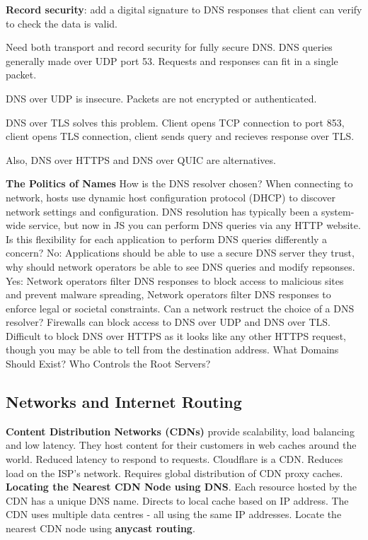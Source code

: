 \documentclass{article}
\begin{document}
\textbf{Record security}: add a digital signature to DNS responses that client can verify to check the data is valid.

Need both transport and record security for fully secure DNS\@.
DNS queries generally made over UDP port 53. Requests and responses can fit in a single packet.

DNS over UDP is insecure. Packets are not encrypted or authenticated.

DNS over TLS solves this problem. Client opens TCP connection to port 853, client opens TLS connection,
client sends query and recieves response over TLS\@.

Also, DNS over HTTPS and DNS over QUIC are alternatives.

\vspace{\baselineskip}
\textbf{The Politics of Names}
How is the DNS resolver chosen? When connecting to network, hosts use dynamic host configuration protocol (DHCP)
to discover network settings and configuration.
DNS resolution has typically been a system-wide service, but now in JS you can perform DNS queries via any HTTP website.
Is this flexibility for each application to perform DNS queries differently a concern?
No: Applications should be able to use a secure DNS server they trust, why should network operators be able to see DNS queries and modify repsonses.
Yes: Network operators filter DNS responses to block access to malicious sites and prevent malware spreading,
Network operators filter DNS responses to enforce legal or societal constraints.
Can a network restruct the choice of a DNS resolver?
Firewalls can block access to DNS over UDP and DNS over TLS\@.
Difficult to block DNS over HTTPS as it looks like any other HTTPS request, though you may be able to tell from the destination address.
What Domains Should Exist?
Who Controls the Root Servers?

\clearpage


\subsection*{Networks and Internet Routing}

\textbf{Content Distribution Networks (CDNs)} provide scalability, load balancing and low latency.
They host content for their customers in web caches around the world.
Reduced latency to respond to requests.
Cloudflare is a CDN\@.
Reduces load on the ISP's network.
Requires global distribution of CDN proxy caches.
\textbf{Locating the Nearest CDN Node using DNS}.
Each resource hosted by the CDN has a unique DNS name.
Directs to local cache based on IP address.
The CDN uses multiple data centres {-} all using the same IP addresses.
Locate the nearest CDN node using \textbf{anycast routing}.
\end{document}
